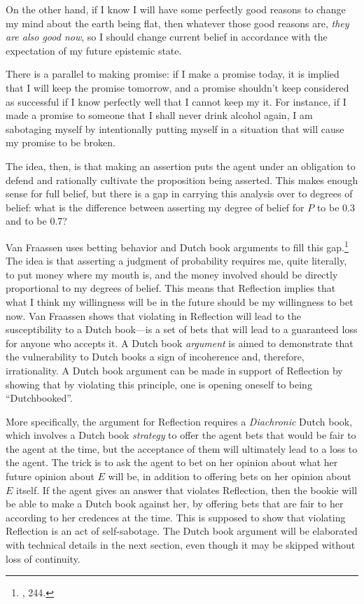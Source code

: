 On the other hand, if I know I will have some perfectly good
reasons to change my mind about the earth being flat, then whatever those good reasons are, \emph{they are also good now}, so I should change current belief in accordance with the expectation of my future epistemic state.

There is a parallel to making promise: if I make a promise today, it is implied that I will keep the promise tomorrow, and a promise shouldn't keep considered as successful if I know perfectly well that I cannot keep my it. For instance, if I made a promise to
someone that I shall never drink alcohol again, I am sabotaging myself
by intentionally putting myself in a situation that will cause my
promise to be broken.

The idea, then, is that making an assertion puts the agent under an
obligation to defend and rationally cultivate the proposition being
asserted. This makes enough sense for full belief, but there is a gap in
carrying this analysis over to degrees of belief:  what is the difference between asserting my degree of belief for \(P\) to be 0.3 and to be
0.7?

Van Fraassen uses betting behavior and Dutch book arguments to fill this
gap.\footnote{\cite{beliefwill}, 244.} The idea is
that asserting a judgment of probability requires me, quite literally,
to put money where my mouth is, and the money involved should be
directly proportional to my degrees of belief. This means that
Reflection implies that what I think my willingness will be in the
future should be my willingness to bet now. Van Fraassen shows that
violating in Reflection will lead to the susceptibility to a 
Dutch book---is a set of bets that will lead to a guaranteed loss
for anyone who accepts it. A Dutch book \emph{argument} is aimed to
demonstrate that the vulnerability to Dutch books a sign of incoherence
and, therefore, irrationality. A Dutch book argument can be made in
support of Reflection by showing that by violating this principle, one
is opening oneself to being ``Dutchbooked''.

More specifically, the argument for Reflection requires a
\emph{Diachronic} Dutch book, which involves a Dutch book
\emph{strategy} to offer the agent bets that would be fair to the agent
at the time, but the acceptance of them will ultimately lead to a loss
to the agent. The trick is to ask the agent to bet on her opinion about
what her future opinion about \(E\) will be, in addition to offering
bets on her opinion about \(E\) itself. If the agent gives an answer
that violates Reflection, then the bookie will be able to make a Dutch
book against her, by offering bets that are fair to her according to her
credences at the time. This is supposed to show that violating
Reflection is an act of self-sabotage. The Dutch book argument will be
elaborated with technical details in the next section, even though it may be
skipped without loss of continuity.

